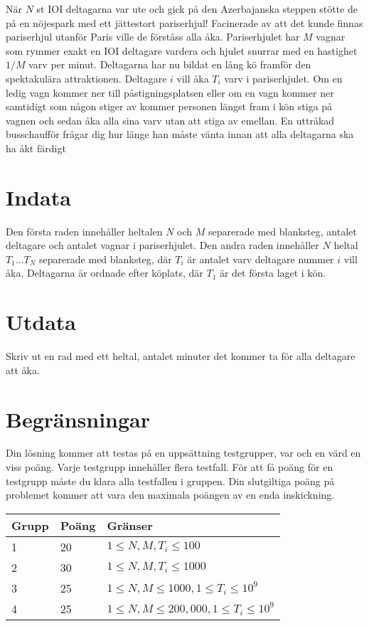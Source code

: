 När $N$ st IOI deltagarna var ute och gick på den Azerbajanska steppen stötte de på en nöjespark med ett jättestort pariserhjul! Facinerade av att det kunde finnas pariserhjul utanför Paris ville de förståss alla åka. Pariserhjulet har $M$ vagnar som rymmer exakt en IOI deltagare vardera och hjulet snurrar med en hastighet $1/M$ varv per minut. Deltagarna har nu bildat en lång kö framför den spektakulära attraktionen. Deltagare $i$ vill åka $T_i$ varv i pariserhjulet. Om en ledig vagn kommer ner till påstigningsplatsen eller om en vagn kommer ner samtidigt som någon stiger av kommer personen längst fram i kön stiga på vagnen och sedan åka alla sina varv utan att stiga av emellan.
En uttråkad busschaufför frågar dig hur länge han måste vänta innan att alla deltagarna ska ha åkt färdigt

\section*{Indata}
Den första raden innehåller heltalen $N$ och $M$ separerade med blanksteg,
antalet deltagare och antalet vagnar i pariserhjulet.
Den andra raden innehåller $N$ heltal $T_1 ... T_N$ separerade med blanksteg,
där $T_i$ är antalet varv deltagare nummer $i$ vill åka. Deltagarna är ordnade efter
köplats, där $T_1$ är det första laget i kön.

\section*{Utdata}
Skriv ut en rad med ett heltal, antalet minuter det kommer ta för alla deltagare att åka.

\section*{Begränsningar}
Din lösning kommer att testas på en uppsättning testgrupper, var och en värd en viss poäng.
Varje testgrupp innehåller flera testfall.
För att få poäng för en testgrupp måste du klara alla testfallen i gruppen.
Din slutgiltiga poäng på problemet kommer att vara den maximala poängen av en enda inskickning.

\noindent
\begin{tabular}{| l | l | l |}
\hline
Grupp & Poäng & Gränser \\ \hline
1     & 20    & $1 \le N, M, T_i \le 100$ \\ \hline
2     & 30    & $1 \le N, M, T_i \le 1000$ \\ \hline
3     & 25    & $1 \le N, M \le 1000, 1 \le T_i \le 10^9$ \\ \hline
4     & 25    & $1 \le N, M \le 200,000, 1 \le T_i \le 10^9$ \\ \hline
\end{tabular}
